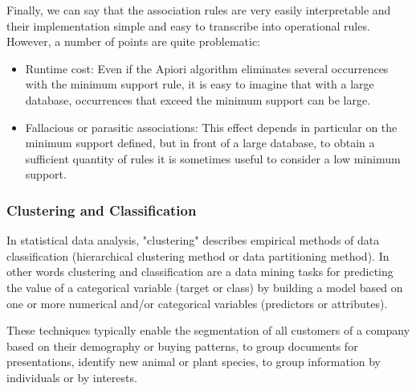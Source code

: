 	Finally, we can say that the association rules are very easily interpretable and their implementation simple and easy to transcribe into operational rules. However, a number of points are quite problematic:
	\begin{itemize}
		\item Runtime cost: Even if the Apiori algorithm eliminates several occurrences with the minimum support rule, it is easy to imagine that with a large database, occurrences that exceed the minimum support can be large.

		\item Fallacious or parasitic associations: This effect depends in particular on the minimum support defined, but in front of a large database, to obtain a sufficient quantity of rules it is sometimes useful to consider a low minimum support.
	\end{itemize}
	
	\pagebreak
	\subsubsection{Clustering and Classification}
	In statistical data analysis, "clustering" describes empirical methods of data classification (hierarchical clustering method or data partitioning method). In other words clustering and classification are a data mining tasks for predicting the value of a categorical variable (target or class) by building a model based on one or more numerical and/or categorical variables (predictors or attributes).

	These techniques typically enable the segmentation of all customers of a company based on their demography or buying patterns, to group documents for presentations, identify new animal or plant species, to group information by individuals or by interests.

